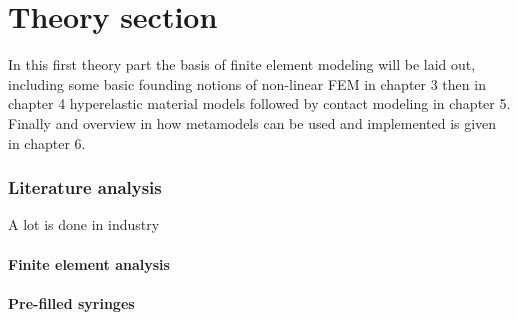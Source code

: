 \newpage
\part{Theory section}
In this first theory part the basis of finite element modeling will be laid out, including some basic founding notions of non-linear FEM in chapter 3 then in chapter 4 hyperelastic material models followed by contact modeling in chapter 5. Finally and overview in how metamodels can be used and implemented is given in chapter 6.
\section{Literature analysis}
A lot is done in industry
\subsection{Finite element analysis}
\subsection{Pre-filled syringes}






